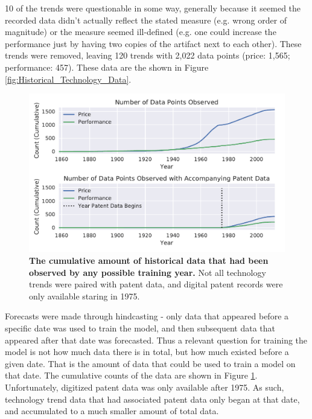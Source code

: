 \documentclass{article}
\begin{document}
10 of the trends were questionable in some way, generally because it seemed the recorded data didn't actually reflect the stated measure (e.g. wrong order of magnitude) or the measure seemed ill-defined (e.g. one could increase the performance just by having two copies of the artifact next to each other). These trends were removed, leaving 120 trends with 2,022 data points (price: 1,565; performance: 457). These data are the shown in Figure \ref{fig:Historical_Technology_Data}.

\begin{figure}
    \centering
    \includegraphics[width=.75\textwidth]{figs/Historical_Technology_Data_Cumulative.pdf}
    \caption{\textbf{The cumulative amount of historical data that had been observed by any possible training year.} Not all technology trends were paired with patent data, and digital patent records were only available staring in 1975.}
    \label{fig:Historical_Technology_Data_Cumulative}
\end{figure}

Forecasts were made through hindcasting - only data that appeared before a specific date was used to train the model, and then subsequent data that appeared after that date was forecasted. Thus a relevant question for training the model is not how much data there is in total, but how much existed before a given date. That is the amount of data that could be used to train a model on that date. The cumulative counts of the data are shown in Figure \ref{fig:Historical_Technology_Data_Cumulative}. Unfortunately, digitized patent data was only available after 1975. As such, technology trend data that had associated patent data only began at that date, and accumulated to a much smaller amount of total data. 
\end{document}
